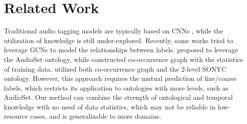 \section{Related Work}

Traditional audio tagging models are typically based on CNNs \citep{kong2019cross,kong2020panns,gong2021psla}, while the utilization of knowledge is still under-explored. Recently, some works tried to leverage GCNs to model the relationships between labels. \citep{shrivaslava2020mt} proposed to leverage the AudioSet ontology, while \citep{wang2020modeling} constructed co-occurrence graph with the statistics of training data. \citep{sun2020ontology} utilized both co-occurrence graph and the 2-level SONYC ontology. However, this approach requires the mutual prediction of fine/coarse labels, which restricts its application to ontologies with more levels, such as AudioSet. Our method can combine the strength of ontological and temporal knowledge with no need of data statistics, which may not be reliable in low-resource cases, and is generalizable to more domains.

